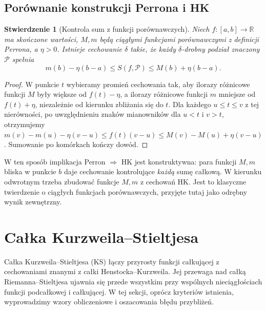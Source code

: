 \documentclass[11pt,a4paper]{article}
\numberwithin{equation}{section}
\theoremstyle{plain}
\newtheorem{stwierdzenie}[twierdzenie]{Stwierdzenie}
\theoremstyle{definition}
\theoremstyle{remark}
\newcommand{\R}{\mathbb R}
\begin{document}
\subsection*{Porównanie konstrukcji Perrona i HK}
\begin{stwierdzenie}[Kontrola sum z funkcji porównawczych]\label{st:perron-sumy}
Niech $f:[a,b]\to\R$ ma skończone wartości, $M,m$ będą ciągłymi funkcjami porównawczymi z definicji Perrona, a $\eta>0$. Istnieje cechowanie $\delta$ takie, że każdy $\delta$-drobny podział znaczony $\mathcal P$ spełnia
\[
 m(b)-\eta(b-a)\le S(f,\mathcal P)\le M(b)+\eta(b-a).
\]
\end{stwierdzenie}
\begin{proof}
W punkcie $t$ wybieramy promień cechowania tak, aby ilorazy różnicowe funkcji $M$ były większe od $f(t)-\eta$, a ilorazy różnicowe funkcji $m$ mniejsze od $f(t)+\eta$, niezależnie od kierunku zbliżania się do $t$. Dla każdego $u\le t\le v$ z tej nierówności, po uwzględnieniu znaków mianowników dla $u<t$ i $v>t$, otrzymujemy
$m(v)-m(u)-\eta(v-u)\le f(t)(v-u)\le M(v)-M(u)+\eta(v-u)$. Sumowanie po komórkach kończy dowód.
\end{proof}
W ten sposób implikacja Perron $\Rightarrow$ HK jest konstruktywna: para funkcji $M,m$ bliska w punkcie $b$ daje cechowanie kontrolujące \emph{każdą} sumę całkową. W kierunku odwrotnym trzeba zbudować funkcje $M,m$ z cechowań HK. Jest to klasyczne twierdzenie o ciągłych funkcjach porównawczych, przyjęte tutaj jako odrębny wynik zewnętrzny.

\section{Całka Kurzweila--Stieltjesa}
\label{sec:kurzweil-stieltjes}
Całka Kurzweila--Stieltjesa (KS) łączy przyrosty funkcji całkującej z cechowaniami znanymi z całki Henstocka--Kurzweila. Jej przewaga nad całką Riemanna--Stieltjesa ujawnia się przede wszystkim przy wspólnych nieciągłościach funkcji podcałkowej i całkującej. W tej sekcji, oprócz kryteriów istnienia, wyprowadzimy wzory obliczeniowe i oszacowania błędu przybliżeń.
\end{document}
